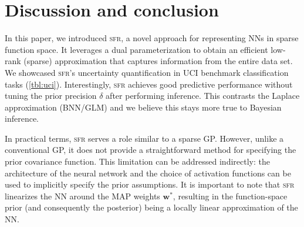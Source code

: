 \documentclass{article}
\newcommand{\our}{\textsc{sfr}\xspace}
\newcommand{\weights}{\ensuremath{\mathbf{w}}}
\begin{document}
\section{Discussion and conclusion}
\label{sec:conclusion}
%
In this paper, we introduced \our, a novel approach for representing NNs in sparse function space.
It leverages a dual parameterization to obtain an efficient low-rank (sparse) approximation that captures information from the entire data set.
We showcased \our's uncertainty quantification in UCI benchmark classification tasks (\cref{tbl:uci}).
Interestingly, \our achieves good predictive performance without tuning the prior precision $\delta$ after performing inference.
This contrasts the Laplace approximation (BNN/GLM) and we believe this stays more true to Bayesian inference.%


In practical terms, \our serves a role similar to a sparse GP. However, unlike a conventional GP, it does not provide a straightforward method for specifying the prior covariance function.
This limitation can be addressed indirectly: the architecture of the neural network and the choice of activation functions can be used to implicitly specify the prior assumptions.
It is important to note that \our linearizes the NN around the MAP weights $\weights^{*}$, resulting in the function-space prior
(and consequently the posterior) being a locally linear approximation of the NN.
\end{document}
